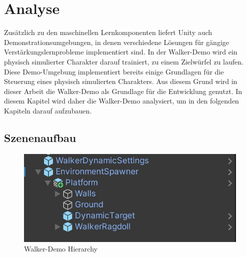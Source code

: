 {\chapter{Analyse}}
\label{sec:analyse}
Zusätzlich zu den maschinellen Lernkomponenten liefert Unity auch Demonstrationsumgebungen, in denen verschiedene Lösungen für gängige Verstärkungslernprobleme implementiert sind. In der Walker-Demo wird ein physisch simulierter Charakter darauf trainiert, zu einem Zielwürfel zu laufen. Diese Demo-Umgebung implementiert bereits einige Grundlagen für die Steuerung eines physisch simulierten Charakters. Aus diesem Grund wird in dieser Arbeit die Walker-Demo als Grundlage für die Entwicklung genutzt. In diesem Kapitel wird daher die Walker-Demo analysiert, um in den folgenden Kapiteln darauf aufzubauen.

\section{Szenenaufbau}

\begin{figure}[H]
  \centering  
  \includegraphics[scale=0.8]{img/walker_demo_hierarchy.png}
  \caption{Walker-Demo Hierarchy}
  \label{fig:walker_demo_hierarchy}
\end{figure}

